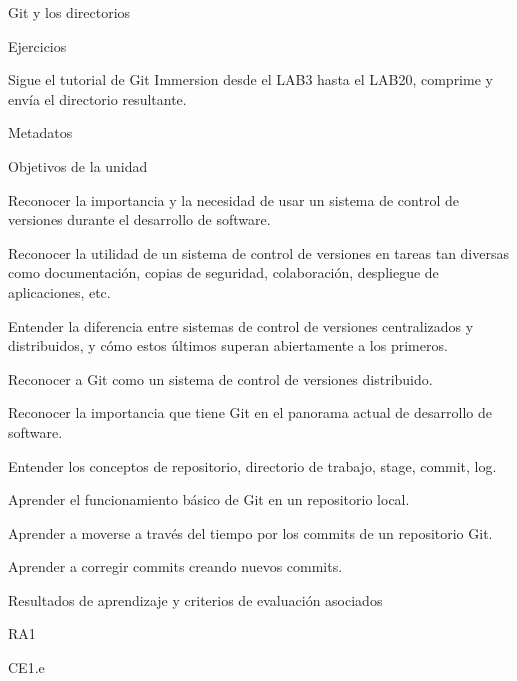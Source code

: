 \begin{longenum}
\begin{longenum}
        \item Git y los directorios
        \item Ejercicios
        \begin{longenum}
            \item Sigue el tutorial de Git Immersion desde el LAB3 hasta el LAB20, comprime y envía el directorio resultante.
        \end{longenum}
        \item Metadatos
        \begin{longenum}
            \item Objetivos de la unidad
            \begin{longenum}
                \item Reconocer la importancia y la necesidad de usar un sistema de control de versiones durante el desarrollo de software.
                \item Reconocer la utilidad de un sistema de control de versiones en tareas tan diversas como documentación, copias de seguridad, colaboración, despliegue de aplicaciones, etc.
                \item Entender la diferencia entre sistemas de control de versiones centralizados y distribuidos, y cómo estos últimos superan abiertamente a los primeros.
                \item Reconocer a Git como un sistema de control de versiones distribuido.
                \item Reconocer la importancia que tiene Git en el panorama actual de desarrollo de software.
                \item Entender los conceptos de repositorio, directorio de trabajo, stage, commit, log.
                \item Aprender el funcionamiento básico de Git en un repositorio local.
                \item Aprender a moverse a través del tiempo por los commits de un repositorio Git.
                \item Aprender a corregir commits creando nuevos commits.
            \end{longenum}
            \item Resultados de aprendizaje y criterios de evaluación asociados
            \begin{longenum}
                \item RA1
                \begin{longenum}
                    \item CE1.e

\end{longenum}
\end{longenum}
\end{longenum}
\end{longenum}
\end{longenum}
